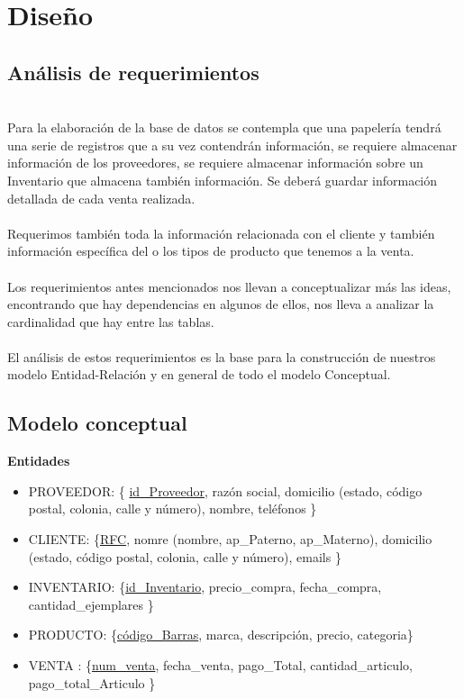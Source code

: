 \documentclass[12pt,letterpaper]{article}
\begin{document}
	\section{Diseño}
	\subsection{Análisis de requerimientos}
	\\Para la elaboración de la base de datos se contempla que una papelería tendrá una serie de registros que a su vez contendrán información, se requiere almacenar información de los proveedores, se requiere almacenar información sobre un Inventario que almacena también información. Se deberá guardar información detallada de cada venta realizada.\\
	\\Requerimos también toda la información relacionada con el cliente y también información específica del o los tipos de producto que tenemos a la venta.\\
	\\Los requerimientos antes mencionados nos llevan a conceptualizar más las ideas, encontrando que hay dependencias en algunos de ellos, nos lleva a analizar la cardinalidad que hay entre las tablas.\\
	\\El análisis de estos requerimientos es la base para la construcción de nuestros modelo Entidad-Relación y en general de todo el modelo Conceptual. 
	
	
	\subsection{Modelo conceptual}
	\textbf{Entidades}\par 
	\begin{itemize}
		\item PROVEEDOR: \{ \underline{id\_Proveedor}, razón social, domicilio (estado, código postal, colonia, calle y número), nombre, teléfonos \}
		\item CLIENTE: \{\underline{RFC}, nomre (nombre, ap\_Paterno, ap\_Materno), domicilio (estado, código postal, colonia, calle y número), emails \}
		\item INVENTARIO: \{\underline{id\_Inventario}, precio\_compra, fecha\_compra, cantidad\_ejemplares \}
		\item PRODUCTO: \{\underline{código\_Barras}, marca, descripción, precio, categoria\}
		\item VENTA : \{\underline{num\_venta}, fecha\_venta, pago\_Total, cantidad\_articulo, pago\_total\_Articulo \}
	\end{itemize}
	
\end{document}
